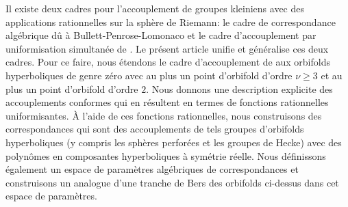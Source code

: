 \documentclass[JEP,XML,SOM,Unicode,NoFloatCountersInSection,published]{cedram}
\theoremstyle{definition}
\theoremstyle{remark}
\begin{document}



\begin{altabstract}
Il existe deux cadres pour l'accouplement de groupes kleiniens avec des applications rationnelles sur la sphère de Riemann: le cadre de correspondance algébrique dû à Bullett-Penrose-Lomonaco \cite{BP94,BL20a} et le cadre d'accouplement par uniformisation simultanée de \cite{MM1}. Le présent article unifie et généralise ces deux cadres. Pour ce faire, nous étendons le cadre d'accouplement de \cite{MM1} aux orbifolds hyperboliques de genre zéro avec au plus un point d'orbifold d'ordre $\nu \geq 3$ et au plus un point d'orbifold d'ordre $2$. Nous donnons une description explicite des accouplements conformes qui en résultent en termes de fonctions rationnelles uniformisantes. À l'aide de ces fonctions rationnelles, nous construisons des correspondances qui sont des accouplements de tels groupes d'orbifolds hyperboliques (y compris les sphères perforées et les groupes de Hecke) avec des polynômes en composantes hyperboliques à symétrie réelle. Nous définissons également un espace de paramètres algébriques de correspondances et construisons un analogue d'une tranche de Bers des orbifolds ci-dessus dans cet espace de paramètres.
\end{altabstract}

\maketitle

\tableofcontents
\mainmatter
\end{document}
